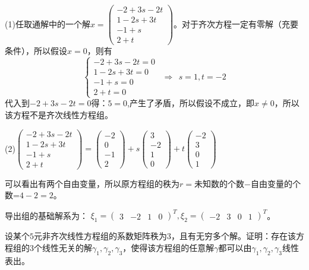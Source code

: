 \documentclass[a4paper]{report}
\begin{document}
\begin{jie}
(1)任取通解中的一个解$x
=\begin{pmatrix}
-2+3s-2t\\
1-2s+3t\\
-1+s\\
2+t
\end{pmatrix}
$。对于齐次方程一定有零解（充要条件），所以假设$x=0$，则有
\begin{equation*}
\begin{cases}
-2+3s-2t=0\\
1-2s+3t=0\\
-1+s=0\\
2+t=0
\end{cases}~~\Rightarrow ~~s=1,t=-2
\end{equation*}
代入到$-2+3s-2t=0$得：$5=0$,产生了矛盾，所以假设不成立，即$x\neq 0$，所以该方程不是齐次线性方程组。

(2)$\begin{pmatrix}
-2+3s-2t\\
1-2s+3t\\
-1+s\\
2+t
\end{pmatrix}=
\begin{pmatrix}
-2\\ 0\\ -1\\ 2
\end{pmatrix}+s\begin{pmatrix}
3\\ -2\\ 1\\ 0
\end{pmatrix}+t\begin{pmatrix}
-2\\ 3\\ 0\\ 1
\end{pmatrix}
$

可以看出有两个自由变量，所以原方程组的秩为$r=$未知数的个数$-$自由变量的个数=$4-2=2$。

导出组的基础解系为：
$\xi_1=\begin{pmatrix}
3& -2& 1& 0
\end{pmatrix}^T,\xi_2=\begin{pmatrix}
-2& 3&0&1
\end{pmatrix}^T$。
\end{jie}

\EX 设某个$5$元非齐次线性方程组的系数矩阵秩为3，且有无穷多个解。证明：存在该方程组的3个线性无关的解$\gamma_1,\gamma_2,\gamma_3$，使得该方程组的任意解$\gamma$都可以由$\gamma_1,\gamma_2,\gamma_3$线性表出。
\end{document}
